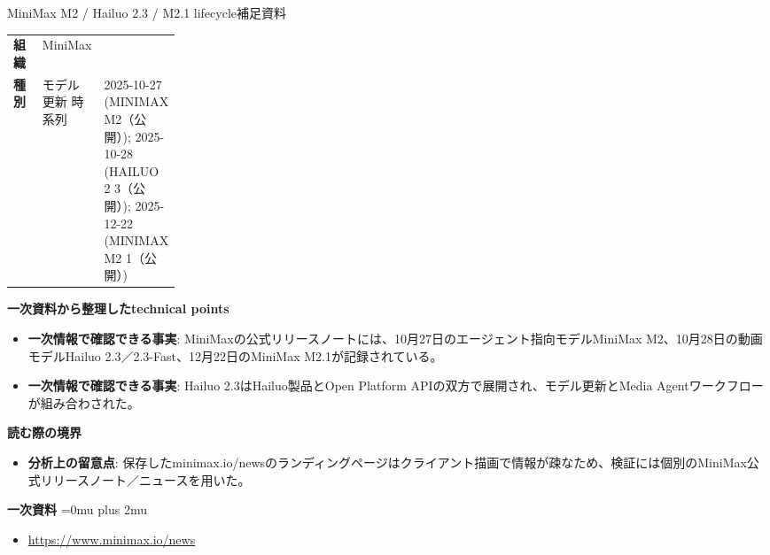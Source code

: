 \begin{technicalnote}{MiniMax M2 / Hailuo 2.3 / M2.1 lifecycle}{補足資料}
\begingroup
\begin{tabularx}{\linewidth}{@{}>{\bfseries}p{0.22\linewidth}X@{}}
組織 & MiniMax \\
種別 & モデル更新
時系列 & 2025-10-27 (MINIMAX M2（公開）); 2025-10-28 (HAILUO 2 3（公開）); 2025-12-22 (MINIMAX M2 1（公開）) \\
\end{tabularx}
\smallskip
{\bfseries 一次資料から整理したtechnical points}
\begin{itemize}[leftmargin=1.5em,itemsep=0.35em]
\item \textbf{一次情報で確認できる事実}: MiniMaxの公式リリースノートには、10月27日のエージェント指向モデルMiniMax M2、10月28日の動画モデルHailuo 2.3／2.3-Fast、12月22日のMiniMax M2.1が記録されている。
\item \textbf{一次情報で確認できる事実}: Hailuo 2.3はHailuo製品とOpen Platform APIの双方で展開され、モデル更新とMedia Agentワークフローが組み合わされた。
\end{itemize}
\begin{minipage}{\linewidth}
{\bfseries 読む際の境界}
\begin{itemize}[leftmargin=1.5em,itemsep=0.35em]
\item \textbf{分析上の留意点}: 保存したminimax.io/newsのランディングページはクライアント描画で情報が疎なため、検証には個別のMiniMax公式リリースノート／ニュースを用いた。
\end{itemize}
\begin{samepage}
{\bfseries 一次資料}
\begingroup\sloppy
\Urlmuskip=0mu plus 2mu\relax
\begin{itemize}[leftmargin=1.5em,itemsep=0.25em]
\item {\scriptsize\url{https://www.minimax.io/news}}
\end{itemize}
\endgroup
\end{samepage}
\end{minipage}
\endgroup
\end{technicalnote}
\medskip
